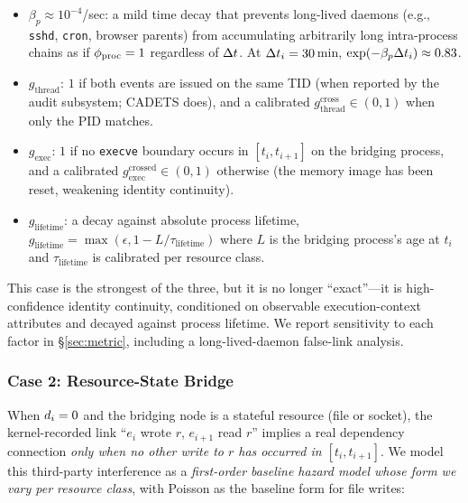 \begin{itemize}
\item $\beta_p \approx 10^{-4}$/sec: a mild time decay that prevents long-lived daemons (e.g., \texttt{sshd}, \texttt{cron}, browser parents) from accumulating arbitrarily long intra-process chains as if $\phi_{\text{proc}}=1$ regardless of $\Delta t$. At $\Delta t_i=30$\,min, $\exp(-\beta_p \Delta t_i) \approx 0.83$.
\item $g_{\text{thread}}$: $1$ if both events are issued on the same TID (when reported by the audit subsystem; CADETS does), and a calibrated $g_{\text{thread}}^{\text{cross}} \in (0, 1)$ when only the PID matches.
\item $g_{\text{exec}}$: $1$ if no \texttt{execve} boundary occurs in $[t_i, t_{i+1}]$ on the bridging process, and a calibrated $g_{\text{exec}}^{\text{crossed}} \in (0, 1)$ otherwise (the memory image has been reset, weakening identity continuity).
\item $g_{\text{lifetime}}$: a decay against absolute process lifetime, $g_{\text{lifetime}} = \max(\epsilon, 1 - L / \tau_{\text{lifetime}})$ where $L$ is the bridging process's age at $t_i$ and $\tau_{\text{lifetime}}$ is calibrated per resource class.
\end{itemize}

This case is the strongest of the three, but it is no longer ``exact''---it is high-confidence identity continuity, conditioned on observable execution-context attributes and decayed against process lifetime. We report sensitivity to each factor in \S\ref{sec:metric}, including a long-lived-daemon false-link analysis.

\subsubsection{Case 2: Resource-State Bridge}
\label{sec:case_res}

When $d_i = 0$ and the bridging node is a stateful resource (file or socket), the kernel-recorded link ``$e_i$ wrote $r$, $e_{i+1}$ read $r$'' implies a real dependency connection \emph{only when no other write to $r$ has occurred in $[t_i, t_{i+1}]$}. We model this third-party interference as a \emph{first-order baseline hazard model whose form we vary per resource class}, with Poisson as the baseline form for file writes:

